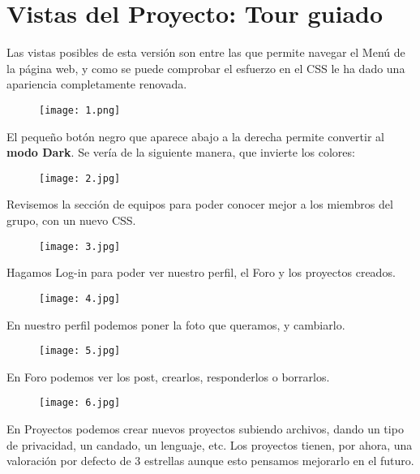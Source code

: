 \documentclass[12pt]{report}
\begin{document}
\section{Vistas del Proyecto: Tour guiado}
Las vistas posibles de esta versión son entre las que permite navegar el Menú de la página web, y como se puede comprobar el esfuerzo en el CSS le ha dado una apariencia completamente renovada. 

\begin{figure}[h]
 \centering
  \texttt{[image: 1.png]}
\end{figure}

El pequeño botón negro que aparece abajo a la derecha permite convertir al \textbf{modo Dark}. Se vería de la siguiente manera, que invierte los colores:

\begin{figure}[h]
 \centering
  \texttt{[image: 2.jpg]}
\end{figure}

Revisemos la sección de equipos para poder conocer mejor a los miembros del grupo, con un nuevo CSS.

\begin{figure}[h]
 \centering
  \texttt{[image: 3.jpg]}
\end{figure}

Hagamos Log-in para poder ver nuestro perfil, el Foro y los proyectos creados.

\begin{figure}[h]
 \centering
  \texttt{[image: 4.jpg]}
\end{figure}

En nuestro perfil podemos poner la foto que queramos, y cambiarlo.

\begin{figure}[h]
 \centering
  \texttt{[image: 5.jpg]}
\end{figure}

En Foro podemos ver los post, crearlos, responderlos o borrarlos.

\begin{figure}[h]
 \centering
  \texttt{[image: 6.jpg]}
\end{figure}

En Proyectos podemos crear nuevos proyectos subiendo archivos, dando un tipo de privacidad, un candado, un lenguaje, etc. Los proyectos tienen, por ahora, una valoración por defecto de 3 estrellas aunque esto pensamos mejorarlo en el futuro.
\end{document}

